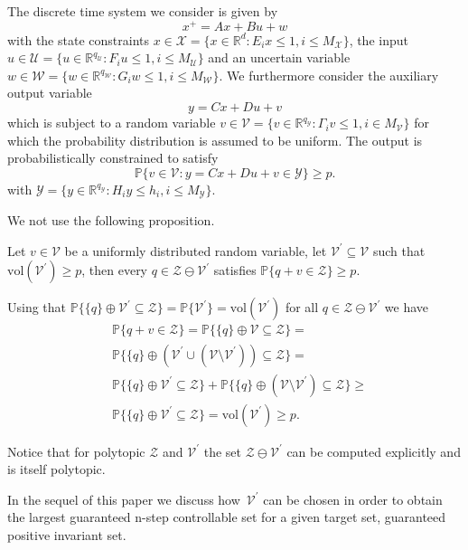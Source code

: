 \documentclass{ifacconf}
\providecommand{\vol}{\text{vol}}
\providecommand{\W}{\mathcal W}
\providecommand{\V}{\mathcal V}
\providecommand{\X}{\mathcal X}
\providecommand{\Y}{\mathcal Y}
\providecommand{\Z}{\mathcal Z}
\providecommand{\U}{\mathcal U}
\providecommand{\PP}{\mathbb P}
\providecommand{\RR}{\mathbb R}
\begin{document}
The discrete time system we consider is given by
%
\begin{equation}
	x^+ = Ax + Bu + w
\end{equation}
%
with the state constraints $x\in\X = \{x\in\RR^d:E_ix\leq 1, i\leq M_\X\}$, the input~$u\in\U = \{u\in\RR^{q_\U}:F_i u\leq 1, i\leq M_\U\}$ and an uncertain variable $w\in\W = \{w\in\RR^{q_\W}:G_i w\leq 1,i\leq M_\W\}$.
%
We furthermore consider the auxiliary output variable 
%
\begin{equation}
	y = Cx + Du + v
\end{equation}
%
which is subject to a random variable $v\in\V = \{v\in\RR^{q_\Y}:\Gamma_i v\leq 1,i\in M_\V\}$ for which the probability distribution is assumed to be uniform.
%
The output is probabilistically constrained to satisfy
%
\begin{equation}\label{eq:probabilistic:constraint}
	\PP\{ v \in \mathcal{V} : y = Cx + Du + v \in \mathcal{Y} \}\geq p.
\end{equation}
%
with $\Y=\{y\in\RR^{q_\Y}:H_i y\leq h_i, i\leq M_\Y\}$.

We not use the following proposition.
%
\begin{prop}
Let $v\in\V$ be a uniformly distributed random variable, let $\V^\prime\subseteq\V$ such that $\vol(\V^\prime)\geq p$, then every $q\in\Z\ominus\V^\prime$ satisfies $\PP\{q+v\in\Z\}\geq p$.
\end{prop}
%
\begin{pf}
%
Using that $\PP\{\{q\}\oplus\V^\prime\subseteq\Z\} = \PP\{\V^\prime\} = \vol(\V^\prime)$ for all $q\in\Z\ominus\V^\prime$ we have
%
\begin{equation}\begin{split}
&\PP\{q+v\in\Z\} = \PP\{\{q\}\oplus\V\subseteq\Z\} = \\
&\PP\{\{q\}\oplus(\V^\prime\cup(\V\setminus\V^\prime))\subseteq\Z\} = \\
&\PP\{\{q\}\oplus\V^\prime\subseteq\Z\} + \PP\{\{q\}\oplus(\V\setminus\V^\prime)\subseteq\Z\}\geq \\
&\PP\{\{q\}\oplus\V^\prime\subseteq\Z\} =\vol(\V^\prime)\geq p.
\end{split}\end{equation}
%
\end{pf}
%
Notice that for polytopic $\Z$ and $\V^\prime$ the set $\Z\ominus\V^\prime$ can be computed explicitly and is itself polytopic.


In the sequel of this paper we discuss how~$\V^\prime$ can be chosen in order to obtain the largest guaranteed n-step controllable set for a given target set, guaranteed positive invariant set.
\end{document}
